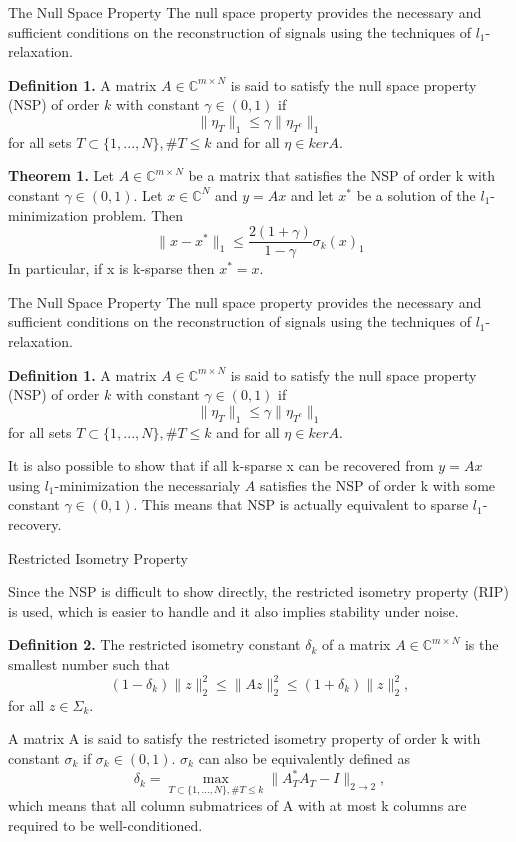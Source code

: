 \documentclass[
  english,            %
  aspectratio=169,    %
]{tumbeamer}
\begin{document}
\begin{frame}{The Null Space Property}
The null space property provides the necessary and sufficient conditions on the reconstruction of signals using the techniques of $l_1$-relaxation.

\bigskip \textbf{Definition 1.} A matrix $A \in \mathbb{C}^{m \times N}$ is said to satisfy the null space property (NSP) of order $k$ with constant $\gamma \in (0, 1)$ if
\[ \lVert \eta_T \rVert_1 \leq \gamma \lVert  \eta_{T^c} \rVert_1 \]
for all sets $T \subset \{1,...,N\}, \#T \leq k$ and for all $\eta \in ker A$.

\bigskip \textbf{Theorem 1.} Let $A \in \mathbb{C}^{m \times N}$ be a matrix that satisfies the NSP of order k with constant $\gamma \in (0, 1)$. Let $x \in \mathbb{C}^N$ and $y = Ax$ and let $x^*$ be a solution of the $l_1$-minimization problem. Then
\[ \lVert x - x^* \rVert_1 \leq \frac{2(1+\gamma)}{1-\gamma} \sigma_k(x)_1 \]
In particular, if x is k-sparse then $x^* = x$.

\end{frame}

\begin{frame}{The Null Space Property}
The null space property provides the necessary and sufficient conditions on the reconstruction of signals using the techniques of $l_1$-relaxation.

\bigskip \textbf{Definition 1.} A matrix $A \in \mathbb{C}^{m \times N}$ is said to satisfy the null space property (NSP) of order $k$ with constant $\gamma \in (0, 1)$ if
\[ \lVert \eta_T \rVert_1 \leq \gamma \lVert  \eta_{T^c} \rVert_1 \]
for all sets $T \subset \{1,...,N\}, \#T \leq k$ and for all $\eta \in ker A$.

\bigskip It is also possible to show that if all k-sparse x can be recovered from $y = Ax$ using $l_1$-minimization the necessarialy $A$ satisfies the NSP of order k with some constant $\gamma \in (0,1)$. This means that NSP is actually equivalent to sparse $l_1$-recovery.
\end{frame}

\begin{frame}{Restricted Isometry Property}

Since the NSP is difficult to show directly, the restricted isometry property (RIP) is used, which is easier to handle and it also implies stability under noise.

\bigskip \textbf{Definition 2.} The restricted isometry constant $\delta_k$ of a matrix $A \in \mathbb{C}^{m \times N}$ is the smallest number such that
\[ (1 - \delta_k) \lVert z \rVert^2_2 \leq \lVert Az \rVert^2_2 \leq (1 + \delta_k) \lVert z \rVert^2_2 ,\]
for all $z \in \Sigma_k$.

A matrix A is said to satisfy the restricted isometry property of order k with constant $\sigma_k$ if $\sigma_k \in (0,1)$. $\sigma_k$ can also be equivalently defined as
\[ \delta_k = \max_{T \subset \{1,...,N\}, \#T \leq k} \lVert A_T^* A_T - I \rVert_{2 \rightarrow 2} ,\]
which means that all column submatrices of A with at most k columns are required to be well-conditioned.
\end{frame}
\end{document}
